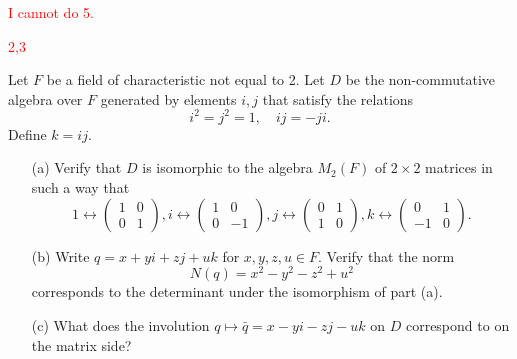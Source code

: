 \documentclass[openany]{book}
\begin{document}
\textcolor{red}{I cannot do 5.}

\textcolor{red}{2,3}

\begin{prob}
    Let \(F\) be a field of characteristic not equal to 2. Let \(D\) be the non-commutative algebra over \(F\) generated by elements \(i,j\) that satisfy the relations
    \[i^2 = j^2 = 1, \quad ij = -ji.\]
    Define \(k = ij.\)
    \begin{itemize}
        \item[(a)] Verify that \(D\) is isomorphic to the algebra \(M_2(F)\) of \(2 \times 2\) matrices in such a way that
        \[1 \leftrightarrow \begin{pmatrix} 1 & 0 \\ 0 & 1 \end{pmatrix}, i \leftrightarrow \begin{pmatrix} 1 & 0 \\ 0 & -1 \end{pmatrix}, j \leftrightarrow \begin{pmatrix} 0 & 1 \\ 1 & 0 \end{pmatrix}, k \leftrightarrow \begin{pmatrix} 0 & 1 \\ -1 & 0 \end{pmatrix}.\]
        \item[(b)] Write \(q = x + yi + zj + uk\) for \(x,y,z,u \in F\). Verify that the norm
        \[N(q) = x^2 - y^2 - z^2 + u^2\]
        corresponds to the determinant under the isomorphism of part (a).
        \item[(c)] What does the involution \(q \mapsto \bar{q} = x - yi - zj - uk\) on \(D\) correspond to on the matrix side?
    \end{itemize}
\end{prob}
\end{document}
